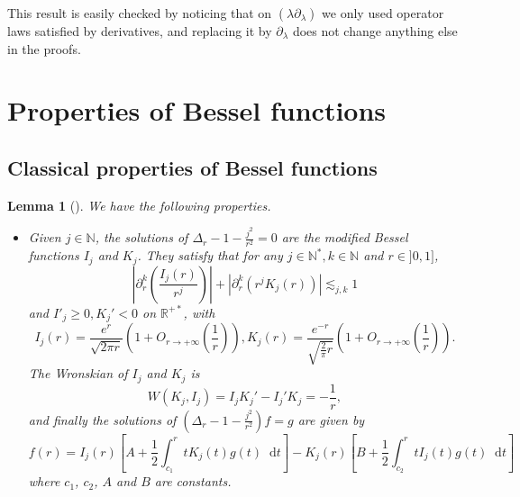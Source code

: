 \documentclass[11 pt]{amsart}
\newtheorem{lem}{Lemma}[section]
\theoremstyle{definition}
\theoremstyle{remark}
\numberwithin{equation}{section}
\newcommand{\dd}{\mathop{}\!\mathrm{d}}
\begin{document}
This result is easily checked by noticing that on $(\lambda
\partial_{\lambda})$ we only used operator laws satisfied by derivatives, and
replacing it by $\partial_{\lambda}$ does not change anything else in the
proofs.


\section{Properties of Bessel functions}

\label{truebesselclassics}

\subsection{Classical properties of Bessel functions}

\begin{lem}[\cite{olver2010nist}]
  \label{besselclassic}
We have the following properties.

\begin{itemize}
\item[a)] Given $j \in \mathbb{N}$, the solutions of $\Delta_r - 1 - \frac{j^2}{r^2}
= 0$ are the modified Bessel functions $I_j$ and $K_j$. They satisfy that for
any $j \in \mathbb{N}^{\ast}, k \in \mathbb{N}$ and $r \in] 0, 1]$,
\[ \left| \partial_r^k \left( \frac{I_j (r)}{r^j} \right) \right| + |
   \partial_r^k (r^j K_j (r)) | \lesssim_{j, k} 1 \]
and $I'_j \geqslant 0, K_j' < 0$ on $\mathbb{R}^{+ \ast}$, with
\[ I_j (r) = \frac{e^r}{\sqrt{2 \pi r}} \left( 1 + O_{r \rightarrow + \infty}
   \left( \frac{1}{r} \right) \right), K_j (r) = \frac{e^{-
   r}}{\sqrt{\frac{2}{\pi} r}} \left( 1 + O_{r \rightarrow + \infty} \left(
   \frac{1}{r} \right) \right) . \]
The Wronskian of $I_j$ and $K_j$ is
\[ W (K_j, I_j) = I_j K_j' - I_j' K_j = - \frac{1}{r}, \]
and finally the solutions of $\left( \Delta_r - 1 - \frac{j^2}{r^2} \right) f
= g$ are given by
\[ f (r) = I_j (r) \left[ A + \frac{1}{2} \int_{c_1}^r t K_j (t) g (t)\dd t
   \right] - K_j (r) \left[ B + \frac{1}{2} \int_{c_2}^r t I_j (t) g (t)\dd t
   \right] \]
where $c_1$, $c_2$, $A$ and $B$ are constants.

\medskip


\end{itemize}
\end{lem}
\end{document}
